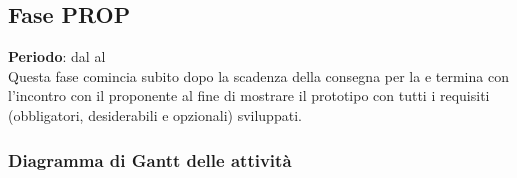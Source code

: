 \subsection{Fase PROP}
	\textbf{Periodo}: dal  al  \\Questa fase comincia subito dopo la scadenza della consegna per la  e termina con l'incontro con il proponente al fine di mostrare il prototipo con tutti i requisiti (obbligatori, desiderabili e opzionali) sviluppati. 
	\subsubsection{Diagramma di Gantt delle attività}
